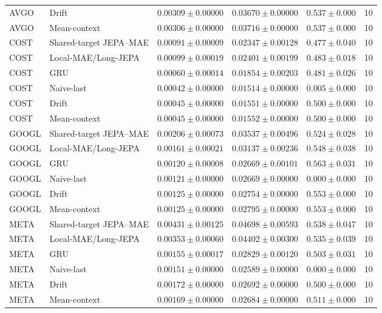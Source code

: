\begin{longtable}{llrrrr}
AVGO & Drift & $0.00309 \pm 0.00000$ & $0.03670 \pm 0.00000$ & $0.537 \pm 0.000$ & 10 \\
AVGO & Mean-context & $0.00306 \pm 0.00000$ & $0.03716 \pm 0.00000$ & $0.537 \pm 0.000$ & 10 \\
COST & Shared-target JEPA--MAE & $0.00091 \pm 0.00009$ & $0.02347 \pm 0.00128$ & $0.477 \pm 0.040$ & 10 \\
COST & Local-MAE/Long-JEPA & $0.00099 \pm 0.00019$ & $0.02401 \pm 0.00199$ & $0.483 \pm 0.018$ & 10 \\
COST & GRU & $0.00060 \pm 0.00014$ & $0.01854 \pm 0.00203$ & $0.481 \pm 0.026$ & 10 \\
COST & Naive-last & $0.00042 \pm 0.00000$ & $0.01514 \pm 0.00000$ & $0.005 \pm 0.000$ & 10 \\
COST & Drift & $0.00045 \pm 0.00000$ & $0.01551 \pm 0.00000$ & $0.500 \pm 0.000$ & 10 \\
COST & Mean-context & $0.00045 \pm 0.00000$ & $0.01552 \pm 0.00000$ & $0.500 \pm 0.000$ & 10 \\
GOOGL & Shared-target JEPA--MAE & $0.00206 \pm 0.00073$ & $0.03537 \pm 0.00496$ & $0.524 \pm 0.028$ & 10 \\
GOOGL & Local-MAE/Long-JEPA & $0.00161 \pm 0.00021$ & $0.03137 \pm 0.00236$ & $0.548 \pm 0.038$ & 10 \\
GOOGL & GRU & $0.00120 \pm 0.00008$ & $0.02669 \pm 0.00101$ & $0.563 \pm 0.031$ & 10 \\
GOOGL & Naive-last & $0.00121 \pm 0.00000$ & $0.02669 \pm 0.00000$ & $0.000 \pm 0.000$ & 10 \\
GOOGL & Drift & $0.00125 \pm 0.00000$ & $0.02754 \pm 0.00000$ & $0.553 \pm 0.000$ & 10 \\
GOOGL & Mean-context & $0.00125 \pm 0.00000$ & $0.02795 \pm 0.00000$ & $0.553 \pm 0.000$ & 10 \\
META & Shared-target JEPA--MAE & $0.00431 \pm 0.00125$ & $0.04698 \pm 0.00593$ & $0.538 \pm 0.047$ & 10 \\
META & Local-MAE/Long-JEPA & $0.00353 \pm 0.00060$ & $0.04402 \pm 0.00300$ & $0.535 \pm 0.039$ & 10 \\
META & GRU & $0.00155 \pm 0.00017$ & $0.02829 \pm 0.00120$ & $0.503 \pm 0.031$ & 10 \\
META & Naive-last & $0.00151 \pm 0.00000$ & $0.02589 \pm 0.00000$ & $0.000 \pm 0.000$ & 10 \\
META & Drift & $0.00172 \pm 0.00000$ & $0.02692 \pm 0.00000$ & $0.500 \pm 0.000$ & 10 \\
META & Mean-context & $0.00169 \pm 0.00000$ & $0.02684 \pm 0.00000$ & $0.511 \pm 0.000$ & 10 \\

\end{longtable}
